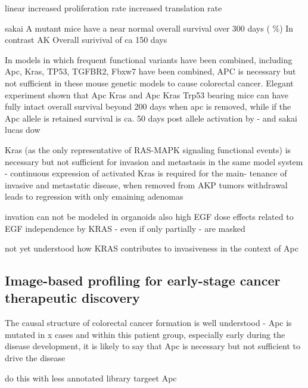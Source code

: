 \begin{flushleft}
linear
increased proliferation rate 
increased translation rate \citep{smitDriverMutationsAdenomacarcinoma2020a}

sakai 
A mutant mice have a near normal overall survival over 300 days ( \%) In contrast AK Overall surivival of ca 150 days 

In models in which frequent functional variants have been combined, including Apc, Kras, TP53, TGFBR2, Fbxw7 have been combined, APC is necessary but not sufficient in these mouse genetic models to cause colorectal cancer. Elegant experiment shown that Apc Kras and Apc Kras Trp53 bearing mice can have fully intact overall survival beyond 200 days when apc is removed, while if the Apc allele is retained survival is ca. 50 days post allele activation by \citep{dowApcRestorationPromotes2015a} - and sakai lucas dow  \citep{sakaiCombinedMutationApc2018a, matanoModelingColorectalCancer2015a, dowApcRestorationPromotes2015a}

Kras (as the only representative of RAS-MAPK signaling functional events) is necessary but not sufficient for invasion and metastasis in the same model system - 
continuous expression of activated Kras is required for the main- tenance of invasive and metastatic disease, when removed from AKP tumors
\citep{boutinOncogenicKrasDrives2017a} 
withdrawal leads to regression with only emaining adenomas 


invation can not be modeled in organoids
also high EGF dose
effects related to EGF independence by KRAS - even if only partially - are masked

not yet understood 
how KRAS contributes to invasiveness in the context of Apc




\subsection{Image-based profiling for early-stage cancer therapeutic discovery}
The causal structure of colorectal cancer formation is well understood - Apc is mutated in x cases and within this patient group, especially early during the disease development, it is likely to say that Apc is necessary but not sufficient to drive the disease


do this with less annotated library
targeet Apc





\end{flushleft}